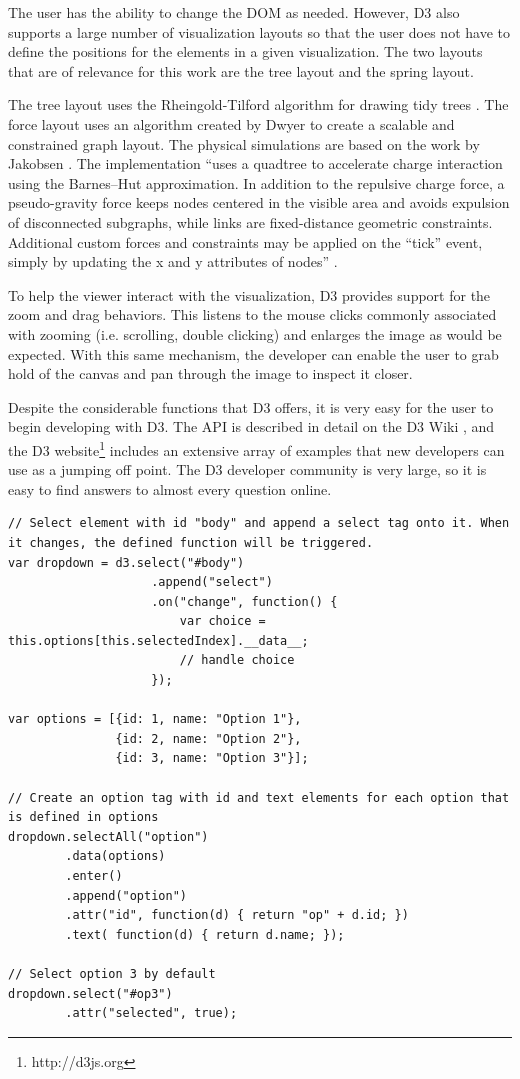 The user has the ability to change the DOM as needed. However, D3 also supports a large number of visualization layouts so that the user does not have to define the positions for the elements in a given visualization. The two layouts that are of relevance for this work are the tree layout and the spring layout.

The tree layout uses the Rheingold-Tilford algorithm for drawing tidy trees \cite{Reingold81}. The force layout uses an algorithm created by Dwyer \cite{Dwyer2009} to create a scalable and constrained graph layout. The physical simulations are based on the work by Jakobsen \cite{Jakobsen03}. The implementation ``uses a quadtree to accelerate charge interaction using the Barnes–Hut approximation. In addition to the repulsive charge force, a pseudo-gravity force keeps nodes centered in the visible area and avoids expulsion of disconnected subgraphs, while links are fixed-distance geometric constraints. Additional custom forces and constraints may be applied on the ``tick'' event, simply by updating the x and y attributes of nodes'' \cite{D3Wiki}.

To help the viewer interact with the visualization, D3 provides support for the zoom and drag behaviors. This listens to the mouse clicks commonly associated with zooming (i.e. scrolling, double clicking) and enlarges the image as would be expected. With this same mechanism, the developer can enable the user to grab hold of the canvas and pan through the image to inspect it closer.

Despite the considerable functions that D3 offers, it is very easy for the user to begin developing with D3. The API is described in detail on the D3 Wiki \cite{D3Wiki}, and the D3 website\footnote{http://d3js.org} includes an extensive array of examples that new developers can use as a jumping off point. The D3 developer community is very large, so it is easy to find answers to almost every question online. 

\lstset{language=Java}
\begin{lstlisting}[caption=Dynamically create a dropdown menu.,label=d3Example]
// Select element with id "body" and append a select tag onto it. When it changes, the defined function will be triggered.
var dropdown = d3.select("#body")
				   	.append("select")
				   	.on("change", function() {
				   		var choice = this.options[this.selectedIndex].__data__;
				   		// handle choice
				   	});

var options = [{id: 1, name: "Option 1"},
			   {id: 2, name: "Option 2"},
			   {id: 3, name: "Option 3"}];

// Create an option tag with id and text elements for each option that is defined in options
dropdown.selectAll("option")
		.data(options)
		.enter()
		.append("option")
		.attr("id", function(d) { return "op" + d.id; })
		.text( function(d) { return d.name; });

// Select option 3 by default
dropdown.select("#op3")
		.attr("selected", true);
\end{lstlisting} 

